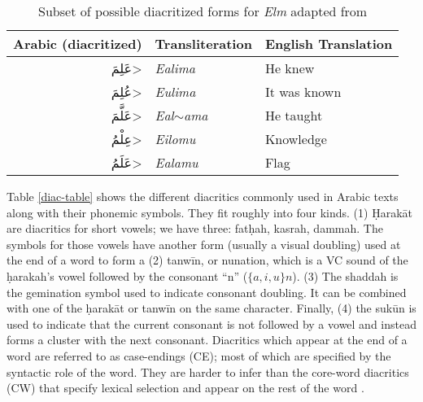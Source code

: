 \documentclass[11pt]{article}
\begin{document}
\begin{table}[ht]
\centering
\begin{tabular}{|r|l|l|}
\hline 
\bf Arabic (diacritized) & \bf Transliteration & \bf English Translation \\ \hline
\<عَلِمَ>   &   \textit{Ealima}          & He knew \\
\<عُلِمَ>   &   \textit{Eulima}          & It was known \\
\<عَلَّمَ>   &   \textit{Eal$\sim$ama}    & He taught \\
\<عِلْمُ>   &   \textit{Eilomu}          & Knowledge \\
\<عَلَمُ>   &   \textit{Ealamu}          & Flag \\
\hline
\end{tabular}
\caption{Subset of possible diacritized forms for \textit{Elm} adapted from \protect\cite{belinkov-glass-2015-arabic} }
\label{elm-table}
\end{table}

Table \ref{diac-table} shows the different diacritics commonly used in Arabic texts along with their phonemic symbols. They fit roughly into four kinds. (1) \d{H}arakāt are diacritics for short vowels; we have three: fat\d{h}ah, kasrah, dammah. The symbols for those vowels have another form (usually a visual doubling) used at the end of a word to form a (2) tanwīn, or nunation, which is a VC sound of the \d{h}arakah's vowel followed by the consonant ``n'' ($\{a,i,u\}n$). (3) The shaddah is the gemination symbol used to indicate consonant doubling. It can be combined with one of the \d{h}arakāt or tanwīn on the same character. Finally, (4) the sukūn is used to indicate that the current consonant is not followed by a vowel and instead forms a cluster with the next consonant. Diacritics which appear at the end of a word are referred to as case-endings (CE); most of which are specified by the syntactic role of the word. They are harder to infer than the core-word diacritics (CW) that specify lexical selection and appear on the rest of the word \cite{mubarak19-highly}.
\end{document}
